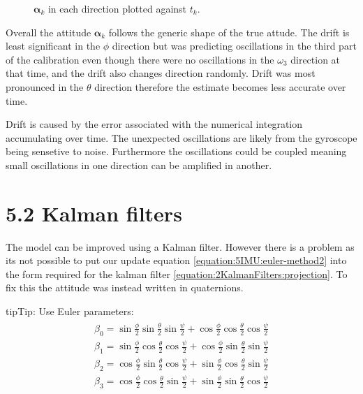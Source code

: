 \documentclass[letterpaper,10pt,english]{jupyterBook}
\begin{document}
\begin{figure}[htbp]
\centering
\capstart

\noindent{}
\caption{\(\boldsymbol{\alpha}_k\) in each direction plotted against \(t_k\). }\label{\detokenize{5IMU:roll-pitch-yaw-drift-real}}\end{figure}

\sphinxAtStartPar
Overall the attitude \(\boldsymbol{\alpha}_k\) follows the generic shape of the true attude. The drift is least significant in the \(\phi\) direction but was predicting oscillations in the third part of the calibration even though there were no oscillations in the \(\omega_3\) direction at that time, and the drift also changes direction randomly. Drift was most pronounced in the \(\theta\) direction therefore the estimate becomes less accurate over time.

\sphinxAtStartPar
Drift is caused by the error associated with the numerical integration accumulating over time. The unexpected oscillations are likely from the gyroscope being sensetive to noise. Furthermore the oscillations could be coupled meaning small oscillations in one direction can be amplified in another.


\section{5.2 Kalman filters}
\label{\detokenize{5IMU:kalman-filters}}
\sphinxAtStartPar
The model can be improved using a Kalman filter. However there is a problem as its not possible to put our update equation \eqref{equation:5IMU:euler-method2} into the form required for the kalman filter \eqref{equation:2KalmanFilters:projection}. To fix this the attitude was instead written in quaternions.

\begin{sphinxadmonition}{tip}{Tip:}
\sphinxAtStartPar
Use Euler parameters:
\begin{align}\label{equation:5IMU:eq-EPs}\!\begin{aligned}
\beta_0 = \sin\frac{\phi}{2}\sin\frac{\theta}{2}\sin\frac{\psi}{2} + \cos\frac{\phi}{2}\cos\frac{\theta}{2}\cos\frac{\psi}{2}\\
\beta_1 = \sin\frac{\phi}{2}\cos\frac{\theta}{2}\cos\frac{\psi}{2} + \cos\frac{\phi}{2}\sin\frac{\theta}{2}\sin\frac{\psi}{2}\\
\beta_2 = \cos\frac{\phi}{2}\sin\frac{\theta}{2}\cos\frac{\psi}{2} + \sin\frac{\phi}{2}\cos\frac{\theta}{2}\sin\frac{\psi}{2}\\
\beta_3 = \cos\frac{\phi}{2}\cos\frac{\theta}{2}\sin\frac{\psi}{2} + \sin\frac{\phi}{2}\sin\frac{\theta}{2}\cos\frac{\psi}{2}\\
\end{aligned}\end{align}\end{sphinxadmonition}
\end{document}
